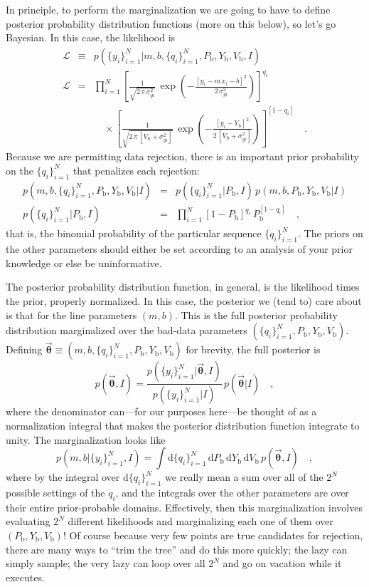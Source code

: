 \documentclass[12pt,twoside]{article}
\newcommand{\mmatrix}[1]{\boldsymbol{#1}}
\newcommand{\parametervector}[1]{\mmatrix{\vec{#1}}}
\newcommand{\pvtheta}{\parametervector{\theta}}
\newcommand{\setofall}[3]{\{{#1}\}_{{#2}}^{{#3}}}
\newcommand{\allq}{\setofall{q_i}{i=1}{N}}
\newcommand{\ally}{\setofall{y_i}{i=1}{N}}
\renewcommand{\d}{\mathrm{d}}
\newcommand{\like}{\mathscr{L}}
\newcommand{\Pbad}{P_{\mathrm{b}}}
\newcommand{\Ybad}{Y_{\mathrm{b}}}
\newcommand{\Vbad}{V_{\mathrm{b}}}
\begin{document}
In principle, to perform the marginalization we are going to have to
define posterior probability distribution functions (more on this
below), so let's go Bayesian.  In this case, the likelihood is
\begin{eqnarray}\displaystyle
\like &\equiv& p(\ally|m,b,\allq,\Pbad,\Ybad,\Vbad,I)
 \nonumber\\
\like &=& \prod_{i=1}^N \left[\frac{1}{\sqrt{2\,\pi\,\sigma_{yi}^2}}
 \,\exp\left(-\frac{[y_i-m\,x_i-b]^2}{2\,\sigma_{yi}^2}\right)\right]^{q_i}
 \nonumber \\ & & \quad\times
 \left[\frac{1}{\sqrt{2\,\pi\,[\Vbad+\sigma_{yi}^2]}}
 \,\exp\left(-\frac{[y_i-\Ybad]^2}{2\,[\Vbad+\sigma_{yi}^2]}\right)\right]^{[1-q_i]}
 \quad .
\end{eqnarray}
Because we are permitting data rejection, there is an important prior
probability on the $\allq$ that penalizes each rejection:
\begin{eqnarray}\displaystyle
p(m,b,\allq,\Pbad,\Ybad,\Vbad|I)
 &=& p(\allq|\Pbad,I)\,p(m,b,\Pbad,\Ybad,\Vbad|I)
 \nonumber\\
p(\allq|\Pbad,I)
 &=& \prod_{i=1}^N[1-\Pbad]^{q_i}\,\Pbad^{[1-q_i]}
 \quad ,
\end{eqnarray}
that is, the binomial probability of the particular sequence $\allq$.
The priors on the other parameters should either be set according to
an analysis of your prior knowledge or else be uninformative.

The posterior probability distribution function, in general, is the
likelihood times the prior, properly normalized.  In this case, the
posterior we (tend to) care about is that for the line parameters
$(m,b)$.  This is the full posterior probability distribution
marginalized over the bad-data parameters $(\allq,\Pbad,\Ybad,\Vbad)$.
Defining $\pvtheta\equiv(m,b,\allq,\Pbad,\Ybad,\Vbad)$ for brevity, the
full posterior is
\begin{equation}
p(\pvtheta,I) =
 \frac{p(\ally|\pvtheta,I)}{p(\ally|I)}
 \,p(\pvtheta|I)
 \quad,
\end{equation}
where the denominator can---for our purposes here---be thought of as a
normalization integral that makes the posterior distribution function
integrate to unity.  The marginalization looks like
\begin{equation}
p(m,b|\ally,I)=\int \d\allq\,\d\Pbad\,\d\Ybad\,\d\Vbad
 \,p(\pvtheta,I) \quad,
\end{equation}
where by the integral over $\d\allq$ we really mean a sum over all of
the $2^N$ possible settings of the $q_i$, and the integrals over the
other parameters are over their entire prior-probable domains.
Effectively, then this marginalization involves evaluating $2^N$
different likelihoods and marginalizing each one of them over
$(\Pbad,\Ybad,\Vbad)$!  Of course because very few points are true
candidates for rejection, there are many ways to ``trim the tree'' and
do this more quickly; the lazy can simply sample; the very lazy can
loop over all $2^N$ and go on vacation while it executes.
  
\end{document}
